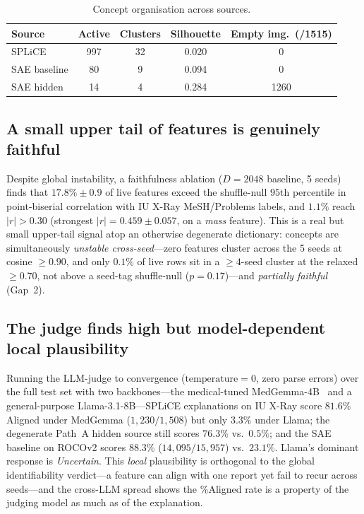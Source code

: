 \documentclass[sigconf, nonacm]{acmart}
\begin{document}
\begin{table}[t]
\caption{Concept organisation across sources.}
\label{tab:org}
\small
\begin{tabular}{lcccc}
\toprule
Source & Active & Clusters & Silhouette & Empty img.\ (/1515) \\
\midrule
SPLiCE & 997 & 32 & 0.020 & 0 \\
SAE baseline & 80 & 9 & 0.094 & 0 \\
SAE hidden & 14 & 4 & 0.284 & 1260 \\
\bottomrule
\end{tabular}
\end{table}

\subsection{A small upper tail of features is genuinely faithful}
Despite global instability, a faithfulness ablation ($D{=}2048$ baseline, 5 seeds) finds that $17.8\%\pm0.9$ of live features exceed the shuffle-null $95$th percentile in point-biserial correlation with IU X-Ray MeSH/Problems labels, and $1.1\%$ reach $|r|>0.30$ (strongest $|r|=0.459\pm0.057$, on a \emph{mass} feature). This is a real but small upper-tail signal atop an otherwise degenerate dictionary: concepts are simultaneously \emph{unstable cross-seed}---zero features cluster across the 5 seeds at cosine ${\geq}0.90$, and only $0.1\%$ of live rows sit in a ${\geq}4$-seed cluster at the relaxed ${\geq}0.70$, not above a seed-tag shuffle-null ($p{=}0.17$)---and \emph{partially faithful} (Gap~2).

\subsection{The judge finds high but model-dependent local plausibility}
\label{sec:judge}
Running the LLM-judge to convergence ($\mathrm{temperature}{=}0$, zero parse errors) over the full test set with two backbones---the medical-tuned MedGemma-4B~\cite{sellergren2025medgemma} and a general-purpose Llama-3.1-8B---SPLiCE explanations on IU X-Ray score $81.6\%$ Aligned under MedGemma ($1{,}230/1{,}508$) but only $3.3\%$ under Llama; the degenerate Path~A hidden source still scores $76.3\%$ vs.\ $0.5\%$; and the SAE baseline on ROCOv2 scores $88.3\%$ ($14{,}095/15{,}957$) vs.\ $23.1\%$. Llama's dominant response is \emph{Uncertain}. This \emph{local} plausibility is orthogonal to the global identifiability verdict---a feature can align with one report yet fail to recur across seeds---and the cross-LLM spread shows the \%Aligned rate is a property of the judging model as much as of the explanation.
\end{document}
